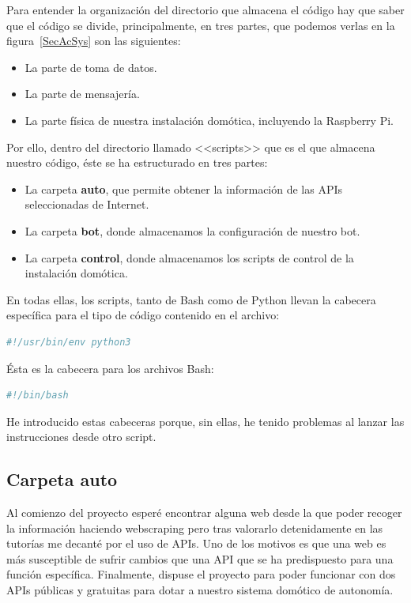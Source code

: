 Para entender la organización del directorio que almacena el código hay que saber que el código se divide, principalmente, en tres partes, que podemos verlas en la figura~\ref{SecAcSys} son las siguientes:

\begin{itemize}
    \item La parte de toma de datos.
    \item La parte de mensajería.
    \item La parte física de nuestra instalación domótica, incluyendo la Raspberry Pi.
\end{itemize}


Por ello, dentro del directorio llamado <<scripts>> que es el que almacena nuestro código, éste se ha estructurado en tres partes:
\begin{itemize}
    \item La carpeta \textbf{auto}, que permite obtener la información de las APIs seleccionadas de Internet.
    \item La carpeta \textbf{bot}, donde almacenamos la configuración de nuestro bot.
    \item La carpeta \textbf{control}, donde almacenamos los scripts de control de la instalación domótica.
\end{itemize}

En todas ellas, los scripts, tanto de Bash como de Python llevan la cabecera específica para el tipo de código contenido en el archivo:

\begin{lstlisting}[language=python,firstnumber=0, basicstyle=\normalsize]
#!/usr/bin/env python3
\end{lstlisting}

Ésta es la cabecera para los archivos Bash:
\begin{lstlisting}[language=sh,firstnumber=0, basicstyle=\normalsize]
#!/bin/bash
\end{lstlisting}

He introducido estas cabeceras porque, sin ellas, he tenido problemas al lanzar las instrucciones desde otro script.

\subsection{Carpeta auto}
Al comienzo del proyecto esperé encontrar alguna web desde la que poder recoger la información haciendo webscraping pero tras valorarlo detenidamente en las tutorías me decanté por el uso de APIs. Uno de los motivos es que una web es más susceptible de sufrir cambios que una API que se ha predispuesto para una función específica. Finalmente, dispuse el proyecto para poder funcionar con dos APIs públicas y gratuitas para dotar a nuestro sistema domótico de autonomía.

